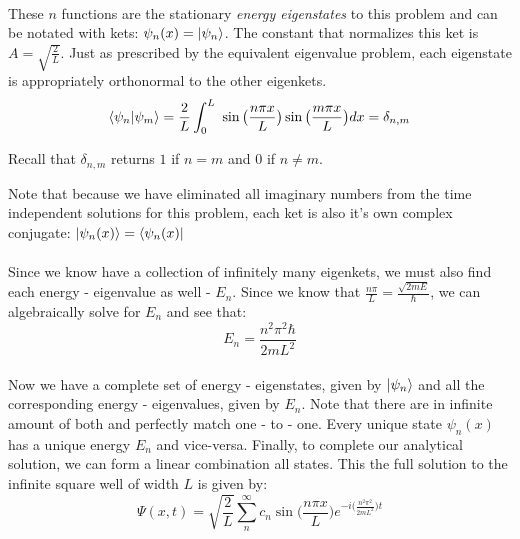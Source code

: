\documentclass[12pt,letterpaper]{book}
\begin{document}
\paragraph*{}These $n$ functions are the stationary \textit{energy eigenstates} to this problem and can be notated with kets: $\psi_n(x) = \ket{\psi_n}$. The constant that normalizes this ket is $ A = \sqrt{\frac{2}{L}}$. Just as prescribed by the equivalent eigenvalue problem, each eigenstate is appropriately orthonormal to the other eigenkets. 
\begin{equation}
\braket{\psi_n}{\psi_m} = \frac{2}{L}\int_0^L \
\sin\big( \frac{n\pi x}{L} \big) \sin\big( \frac{m\pi x}{L} \big) dx =
\delta_{n,m}
\end{equation}
\begin{flushright}
Recall that $\delta_{n,m}$ returns $1$ if $n = m$ and $0$ if $n \neq m$.
\end{flushright}
Note that because we have eliminated all imaginary numbers from the time independent solutions for this problem, each ket is also it's own complex conjugate: $\ket{\psi_n(x)} = \bra{\psi_n(x)}$
\paragraph*{}Since we know have a collection of infinitely many eigenkets, we must also find each energy - eigenvalue as well - $E_n$. Since we know that $\frac{n\pi}{L} = \frac{\sqrt{2mE}}{\hbar}$, we can algebraically solve for $E_n$ and see that:
\begin{equation}
\label{energy for ISW}
E_n = \frac{n^2 \pi^2 \hbar}{2mL^2}
\end{equation}
\paragraph*{}Now we have a complete set of energy - eigenstates, given by $\ket{\psi_n}$ and all the corresponding energy - eigenvalues, given by $E_n$. Note that there are in infinite amount of both and perfectly match one - to - one. Every unique state $\psi_n(x)$ has a unique energy $E_n$ and vice-versa. Finally, to complete our analytical solution, we can form a linear combination all states. This the full solution to the infinite square well of width $L$ is given by:
\begin{equation}
\label{ISW Full Solution}
\Psi(x,t) = \sqrt{\frac{2}{L}} \sum_n^{\infty} 
c_n \sin \Big( \frac{n\pi x}{L} \Big)
e^{-i\big( \frac{n^2 \pi^2}{2mL^2} \big)t}
\end{equation} 
\end{document}
